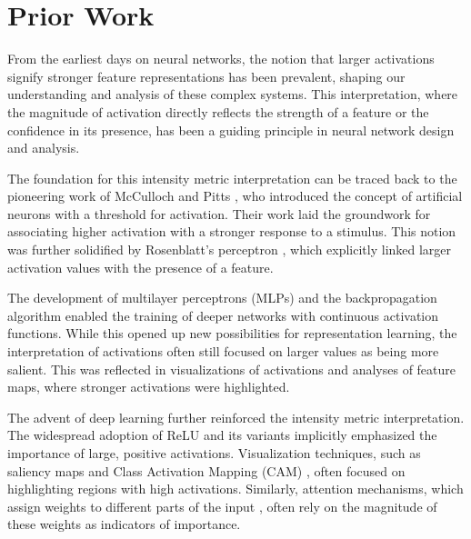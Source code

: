 \section{Prior Work}

From the earliest days on neural networks, the notion that larger activations signify stronger feature representations has been prevalent, shaping our understanding and analysis of these complex systems. \citep{erhan2009visualizing, lecun1998gradient, mcculloch1943logical, rosenblatt1958perceptron, rumelhart1986learning} This interpretation, where the magnitude of activation directly reflects the strength of a feature or the confidence in its presence, has been a guiding principle in neural network design and analysis. \citep{zeiler2014visualizing,yosinski2015understanding,olah2017feature}  

The foundation for this intensity metric interpretation can be traced back to the pioneering work of McCulloch and Pitts \citep{mcculloch1943logical}, who introduced the concept of artificial neurons with a threshold for activation. Their work laid the groundwork for associating higher activation with a stronger response to a stimulus. This notion was further solidified by Rosenblatt's perceptron \citep{rosenblatt1958perceptron}, which explicitly linked larger activation values with the presence of a feature. \citep{rosenblatt1958perceptron,olah2017feature}

The development of multilayer perceptrons (MLPs) and the backpropagation algorithm \citep{rumelhart1986learning} enabled the training of deeper networks with continuous activation functions. \citep{lecun1989backpropagation,hornik1989multilayer,glorot2011deep} While this opened up new possibilities for representation learning, the interpretation of activations often still focused on larger values as being more salient. This was reflected in visualizations of activations and analyses of feature maps, where stronger activations were highlighted. \citep{zeiler2014visualizing,yosinski2015understanding}

The advent of deep learning further reinforced the intensity metric interpretation. \citep{krizhevsky2012imagenet} The widespread adoption of ReLU and its variants \citep{nair2010rectified,glorot2011deep} implicitly emphasized the importance of large, positive activations.  Visualization techniques, such as saliency maps \citep{simonyan2013deep} and Class Activation Mapping (CAM) \citep{zhou2016learning}, often focused on highlighting regions with high activations. Similarly, attention mechanisms, which assign weights to different parts of the input \citep{bahdanau2014neural,vaswani2017attention}, often rely on the magnitude of these weights as indicators of importance. 

